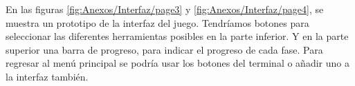 En las figuras \ref{fig:Anexos/Interfaz/page3} y \ref{fig:Anexos/Interfaz/page4}, se muestra un prototipo de la interfaz del juego. Tendríamos botones para seleccionar las diferentes herramientas posibles en la parte inferior. Y en la parte superior una barra de progreso, para indicar el progreso de cada fase. Para regresar al menú principal se podría usar los botones del terminal o añadir uno a la interfaz también.





